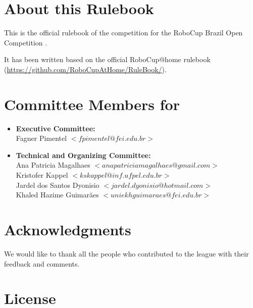 

\section*{About this Rulebook}  
This is the official rulebook of the \AtHome{} competition for the RoboCup Brazil Open Competition \YEAR.

It has been written based on the official RoboCup@home rulebook (\url{https://github.com/RoboCupAtHome/RuleBook/}). 

\section*{Committee Members for \YEAR}
\begin{itemize}
    \item \textbf{Executive Committee:} \\ Fagner Pimentel $<fpimentel@fei.edu.br>$
    \item \textbf{Technical and Organizing Committee:} \\ 
    Ana Patricia Magalhaes $<anapatriciamagalhaes@gmail.com>$ \\
    Kristofer Kappel $<kskappel@inf.ufpel.edu.br>$ \\
    Jardel dos Santos Dyonisio  $<jardel.dyonisio@hotmail.com>$ \\
    Khaled Hazime Guimarães $<uniekhguimaraes@fei.edu.br>$
\end{itemize}

\section*{Acknowledgments}
\label{sec:acknowledgments}

We would like to thank all the people who contributed to the \AtHome{} league with their feedback and comments.

\vfill

\section*{License}

\doclicenseThis

